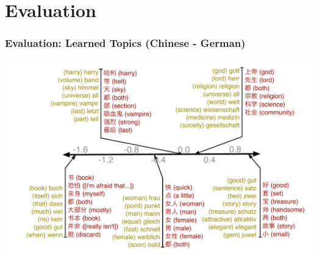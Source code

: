 \section{Evaluation}


\frame
{
  \frametitle{Evaluation: Learned Topics (Chinese - German)}

\begin{center}
\includegraphics[width=0.9\linewidth]{mlslda/chinese_amazon_dict}
\end{center}

}
\fi

